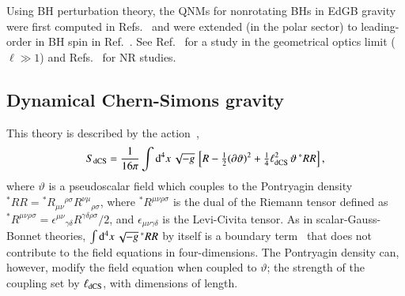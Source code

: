 \documentclass[twocolumn,
               prd,
               aps,
               superscriptaddress,
               tightenlines,
               nofootinbib,
               eqsecnum,
               amsfonts,
               amsmath,
               longbibliography]{revtex4-1}
\newcommand{\dV}{{\rm d}^{4}x \, \sqrt{-g} \,}
\newcommand{\hs}[1]{{\textcolor{TealBlue}{{#1}}}}
\begin{document}
Using BH perturbation theory, the QNMs for nonrotating BHs in EdGB gravity
were first computed in Refs.~\cite{Pani:2009wy,Blazquez-Salcedo:2016enn}
and were extended \hs{(in the polar sector)} to leading-order in BH spin in Ref.~\cite{Pierini:2021jxd}.
%
See Ref.~\cite{Bryant:2021xdh} for a study in the geometrical optics limit ($\ell \gg 1$) and
Refs.~\cite{Witek:2018dmd,Okounkova:2019zep} for NR studies.

\subsection{Dynamical Chern-Simons gravity}
\label{sec:review_dcs}

This theory is described by the action~\cite{Jackiw:2003pm,Alexander:2009tp},
%
\begin{align} \label{eq:action_dcs}
    S_{\rm dCS} = \frac{1}{16 \pi}
    \int \dV
    \left[
    R - \tfrac{1}{2}(\partial \vartheta)^2
    + \tfrac{1}{4} \ell^{2}_{\rm dCS} \, \vartheta \, {}^{*}RR
    \right],
    \nonumber \\
\end{align}
%
where $\vartheta$ is a pseudoscalar field which couples to the Pontryagin
density
${}^{*}RR = {}^{*}R_{\mu\nu}{}^{\rho\sigma} R^{\nu\mu}{}_{\rho\sigma}$,
%
where ${}^{*}R^{\mu\nu\rho\sigma}$ is the dual of the Riemann tensor
defined as
%
${}^{*}R^{\mu\nu\rho\sigma} =
\epsilon^{\mu\nu}{}_{\gamma\delta}
R^{\gamma\delta\rho\sigma} / 2$,
%
and $\epsilon_{\mu\nu\gamma\delta}$ is the Levi-Civita tensor.
%
As in scalar-Gauss-Bonnet theories, $\int \dV {}^{*}RR$ by itself is a boundary
term~\cite{Jackiw:2003pm} that does not contribute to the field equations in
four-dimensions.
%
The Pontryagin density can, however, modify the field equation when coupled to $\vartheta$;
the strength of the coupling set by $\ell_{\rm dCS}$, with dimensions of length.
%
\end{document}
